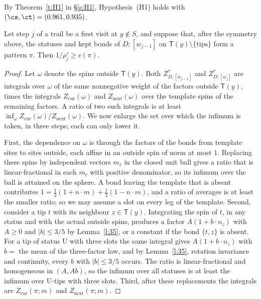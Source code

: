 By Theorem~\ref{t:H1} in \S\ref{s:H1}, Hypothesis~(H1) holds with $(\cs, \ct) = (0.961, 0.935)$.

\begin{lemma}\label{l:local}
Let step $j$ of a trail be a first visit at $y \notin S$, and suppose that, after the symmetry above, the statuses and kept bonds of $D;[w_{j - 1}]$ on $\mathsf T(y) \setminus \{\text{tips}\}$ form a pattern $\pi$. Then $1/\rho^\tau_j \ge c(\pi)$.
\end{lemma}

\begin{proof}
Let $\omega$ denote the spins outside $\mathsf T(y)$. Both $Z^\tau_{D;[w_{j - 1}]}$ and $Z^\tau_{D;[w_j]}$ are integrals over $\omega$ of the same nonnegative weight of the factors outside $\mathsf T(y)$, times the integrals $Z_{\mathrm{cur}}(\omega)$ and $Z_{\mathrm{next}}(\omega)$ over the template spins of the remaining factors. A ratio of two such integrals is at least $\inf_\omega Z_{\mathrm{cur}}(\omega)/Z_{\mathrm{next}}(\omega)$. We now enlarge the set over which the infimum is taken, in three steps; each can only lower it.

First, the dependence on $\omega$ is through the factors of the bonds from template sites to sites outside, each affine in an outside spin of norm at most $1$. Replacing these spins by independent vectors $m_\ell$ in the closed unit ball gives a ratio that is linear-fractional in each $m_\ell$ with positive denominator, so its infimum over the ball is attained on the sphere. A bond leaving the template that is absent contributes $1 = \frac12 (1 + n \cdot m) + \frac12 (1 - n \cdot m)$, and a ratio of averages is at least the smaller ratio; so we may assume a slot on every leg of the template. Second, consider a tip $t$ with its neighbour $z \in \mathsf T(y)$. Integrating the spin of $t$, in any status and with the actual outside spins, produces a factor $A (1 + b \cdot n_z)$ with $A \ge 0$ and $|b| \le 3/5$ by Lemma~\ref{l:35}, or a constant if the bond $\{t, z\}$ is absent. For a tip of status $\mathrm U$ with three slots the same integral gives $A(1 + b \cdot n_z)$ with $b = $ the mean of the three-factor law, and by Lemma~\ref{l:35}, rotation invariance and continuity, every $b$ with $|b| \le 3/5$ occurs. The ratio is linear-fractional and homogeneous in $(A, A b)$, so the infimum over all statuses is at least the infimum over $\mathrm U$-tips with three slots. Third, after these replacements the integrals are $Z_{\mathrm{cur}}(\pi; m)$ and $Z_{\mathrm{next}}(\pi; m)$.
\end{proof}

